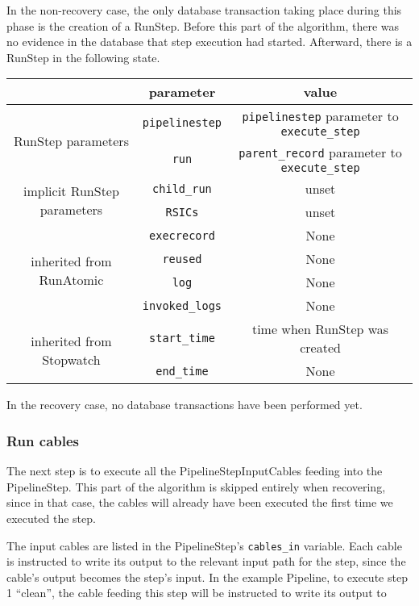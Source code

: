 \documentclass[12pt]{article}
\newcommand{\code}[1]{\texttt{#1}}
\begin{document}
In the non-recovery case, the only database transaction taking place during
this phase is the creation of a RunStep. Before this part of the algorithm,
there was no evidence in the database that step execution had started.
Afterward, there is a RunStep in the following state.
\begin{center}
  \begin{tabular}{|c|c|c|}
    \hline
    & \textbf{parameter} & \textbf{value} \\
    \hline
    \multirow{2}{*}{RunStep parameters} & \code{pipelinestep} & \code{pipelinestep} parameter to \code{execute\_step} \\
    & \code{run} & \code{parent\_record} parameter to \code{execute\_step} \\
    \hline
    \multirow{2}{*}{implicit RunStep parameters} & \code{child\_run} & unset \\
    & \code{RSICs} & unset \\
    \hline
    \multirow{4}{*}{inherited from RunAtomic} & \code{execrecord} & None \\
    & \code{reused} & None \\
    & \code{log} & None \\
    & \code{invoked\_logs} & None \\
    \hline
    \multirow{2}{*}{inherited from Stopwatch} & \code{start\_time} & time when RunStep was created \\
    & \code{end\_time} & None \\
    \hline
  \end{tabular}
\end{center}

In the recovery case, no database transactions have been performed yet.

\subsubsection*{Run cables}

The next step is to execute all the PipelineStepInputCables feeding into the
PipelineStep. This part of the algorithm is skipped entirely when recovering,
since in that case, the cables will already have been executed the first time
we executed the step.

The input cables are listed in the PipelineStep's \code{cables\_in} variable.
Each cable is instructed to write its output to the relevant input path for the
step, since the cable's output becomes the step's input. In the example
Pipeline, to execute step 1 ``clean'', the cable feeding this step will be
instructed to write its output to
\end{document}
